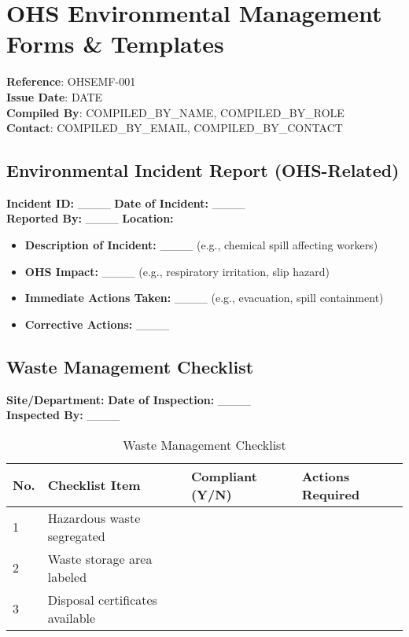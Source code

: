 \documentclass[11pt]{article}
\newcommand{\docTitle}{OHS Environmental Management Forms \& Templates}
\newcommand{\refNumber}{OHSEMF-001}
\newcommand{\issueDate}{{{DATE}}}
\newcommand{\location}{}
\newcommand{\compilerName}{{{COMPILED_BY_NAME}}}
\newcommand{\compilerRole}{{{COMPILED_BY_ROLE}}}
\newcommand{\compilerEmail}{{{COMPILED_BY_EMAIL}}}
\newcommand{\compilerPhone}{{{COMPILED_BY_CONTACT}}}
\begin{document}
\section*{\docTitle}
\textbf{Reference}: \refNumber \\
\textbf{Issue Date}: \issueDate \\
\textbf{Compiled By}: \compilerName, \compilerRole \\
\textbf{Contact}: \compilerEmail, \compilerPhone

\subsection*{Environmental Incident Report (OHS-Related)}

\textbf{Incident ID:} \_\_\_\_ \textbf{Date of Incident:} \_\_\_\_ \\
\textbf{Reported By:} \_\_\_\_ \textbf{Location:} \location

\begin{itemize}
    \item \textbf{Description of Incident:} \_\_\_\_ (e.g., chemical spill affecting workers)
    \item \textbf{OHS Impact:} \_\_\_\_ (e.g., respiratory irritation, slip hazard)
    \item \textbf{Immediate Actions Taken:} \_\_\_\_ (e.g., evacuation, spill containment)
    \item \textbf{Corrective Actions:} \_\_\_\_
\end{itemize}

\subsection*{Waste Management Checklist}

\textbf{Site/Department:} \location \textbf{Date of Inspection:} \_\_\_\_ \\
\textbf{Inspected By:} \_\_\_\_

\begin{table}[h]
    \centering
    \begin{tabular}{p{1cm}p{5cm}p{2cm}p{3cm}}
        \toprule
        \textbf{No.} & \textbf{Checklist Item} & \textbf{Compliant (Y/N)} & \textbf{Actions Required} \\
        \midrule
        1 & Hazardous waste segregated & & \\
        2 & Waste storage area labeled & & \\
        3 & Disposal certificates available & & \\
        \bottomrule
    \end{tabular}
    \caption{Waste Management Checklist}
\end{table}
\end{document}
